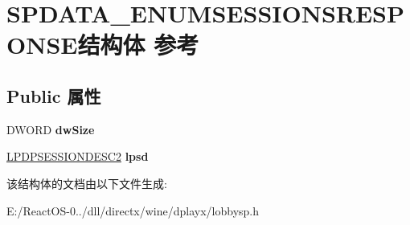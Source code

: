 \hypertarget{struct_s_p_d_a_t_a___e_n_u_m_s_e_s_s_i_o_n_s_r_e_s_p_o_n_s_e}{}\section{S\+P\+D\+A\+T\+A\+\_\+\+E\+N\+U\+M\+S\+E\+S\+S\+I\+O\+N\+S\+R\+E\+S\+P\+O\+N\+S\+E结构体 参考}
\label{struct_s_p_d_a_t_a___e_n_u_m_s_e_s_s_i_o_n_s_r_e_s_p_o_n_s_e}
\subsection*{Public 属性}
\begin{DoxyCompactItemize}
\item 
\mbox{\label{struct_s_p_d_a_t_a___e_n_u_m_s_e_s_s_i_o_n_s_r_e_s_p_o_n_s_e_af954fc579cca7d68834364baad5905b9}} 
D\+W\+O\+RD {\bfseries dw\+Size}
\item 
\mbox{\label{struct_s_p_d_a_t_a___e_n_u_m_s_e_s_s_i_o_n_s_r_e_s_p_o_n_s_e_a079d5f1c9aafaabb17099379ea310c2e}} 
\hyperlink{structtag_d_p_s_e_s_s_i_o_n_d_e_s_c2}{L\+P\+D\+P\+S\+E\+S\+S\+I\+O\+N\+D\+E\+S\+C2} {\bfseries lpsd}
\end{DoxyCompactItemize}


该结构体的文档由以下文件生成\+:\begin{DoxyCompactItemize}
\item 
E\+:/\+React\+O\+S-\/0../dll/directx/wine/dplayx/lobbysp.\+h\end{DoxyCompactItemize}
